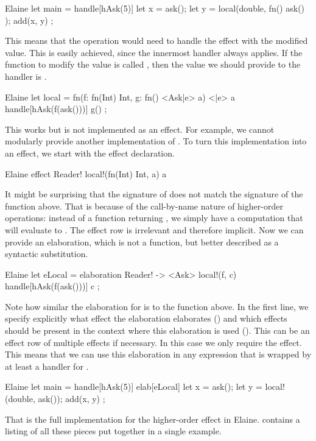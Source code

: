 \begin{lst}{Elaine}
let main = handle[hAsk(5)] {
    let x = ask();
    let y = local(double, fn() { ask() });
    add(x, y)
};
\end{lst}
%
This means that the  operation would need to handle the  effect with the modified value. This is easily achieved, since the innermost handler always applies. If the function to modify the value is called , then the value we should provide to the handler is .

\begin{lst}{Elaine}
let local = fn(f: fn(Int) Int, g: fn() <Ask|e> a) <|e> a {
    handle[hAsk(f(ask()))] { g() }
};
\end{lst}
%
This works but is not implemented as an effect. For example, we cannot modularly provide another implementation of . To turn this implementation into an effect, we start with the effect declaration.

\begin{lst}{Elaine}
effect Reader! {
    local!(fn(Int) Int, a) a
}
\end{lst}
%
It might be surprising that the signature of  does not match the signature of the function above. That is because of the call-by-name nature of higher-order operations: instead of a function returning , we simply have a computation that will evaluate to . The effect row is irrelevant and therefore implicit. Now we can provide an elaboration, which is not a function, but better described as a syntactic substitution.

\begin{lst}{Elaine}
let eLocal = elaboration Reader! -> <Ask> {
    local!(f, c) {
        handle[hAsk(f(ask()))] c
    }
};
\end{lst}
%
Note how similar the elaboration for  is to the  function above. In the first line, we specify explicitly what effect the elaboration elaborates () and which effects should be present in the context where this elaboration is used (). This can be an effect row of multiple effects if necessary. In this case we only require the  effect. This means that we can use this elaboration in any expression that is wrapped by at least a handler for .

\begin{lst}{Elaine}
let main = handle[hAsk(5)] elab[eLocal] {
    let x = ask();
    let y = local!(double, ask());
    add(x, y)
};
\end{lst}
%
That is the full implementation for the higher-order  effect in Elaine.  contains a listing of all these pieces put together in a single example.

